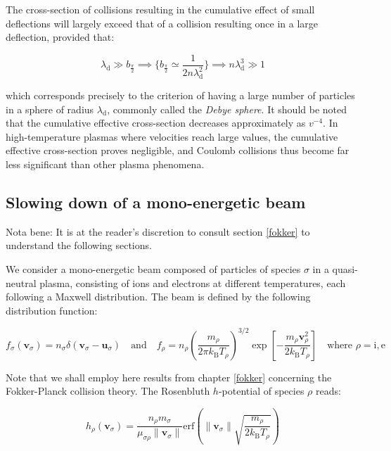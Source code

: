 The cross-section of collisions resulting in the cumulative effect of small deflections will largely exceed that of a collision resulting once in a large deflection, provided that:

\begin{equation}
    \lambda_\mathrm{d}\gg b_\frac{\pi}{2}\implies\bigg\{b_\frac{\pi}{2}\simeq\frac{1}{2n\lambda_\mathrm{d}^2}\bigg\}\implies n\lambda_\mathrm{d}^3\gg1
\end{equation}

which corresponds precisely to the criterion of having a large number of particles in a sphere of radius $\lambda_\mathrm{d}$, commonly called the \textit{Debye sphere}. It should be noted that the cumulative effective cross-section decreases approximately as $v^{-4}$. In high-temperature plasmas where velocities reach large values, the cumulative effective cross-section proves negligible, and Coulomb collisions thus become far less significant than other plasma phenomena.

\subsection{Slowing down of a mono-energetic beam}

Nota bene: It is at the reader's discretion to consult section \ref{fokker} to understand the following sections.

\vspace*{5pt}

We consider a mono-energetic beam composed of particles of species $\sigma$ in a quasi-neutral plasma, consisting of ions and electrons at different temperatures, each following a Maxwell distribution. The beam is defined by the following distribution function:

\begin{equation}
    f_\sigma(\mathbf{v}_\sigma)=n_\sigma\delta(\mathbf{v}_\sigma-\mathbf{u}_\sigma)\quad\text{and}\quad f_\rho=n_\rho\left(\frac{m_\rho}{2\pi k_\mathrm{B}T_\rho}\right)^{3/2}\exp{\left[-\frac{m_\rho\mathbf{v}_\rho^2}{2k_\mathrm{B}T_\rho}\right]}\quad\text{where }\rho=\mathrm{i},\text{e}
\end{equation}

Note that we shall employ here results from chapter \ref{fokker} concerning the Fokker-Planck collision theory. The Rosenbluth $h$-potential of species $\rho$ reads:

\begin{equation}
    h_\rho(\mathbf{v}_\sigma)=\frac{n_\rho m_\sigma}{\mu_{\sigma\rho}\|\mathbf{v}_\sigma\|}\mathrm{erf}{\left(\|\mathbf{v}_\sigma\|\sqrt{\frac{m_\rho}{2k_\mathrm{B}T_\rho}}\right)}
\end{equation}

